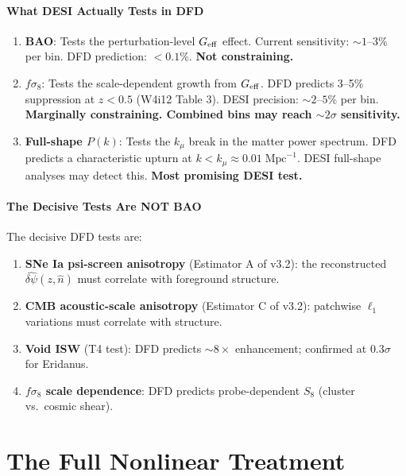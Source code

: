 \documentclass[11pt,a4paper]{article}
\newcounter{findingctr}
\newenvironment{finding}[1][]{%
  \refstepcounter{findingctr}%
  \begin{tcolorbox}[colback=blue!3!white, colframe=blue!50!black,
    title=\textbf{Finding \thefindingctr: #1}]
}{%
  \end{tcolorbox}%
}
\newcommand{\Geff}{G_{\rm eff}}
\begin{document}
\begin{finding}[\textbf{DFD Survives DESI}---But the Test Was Always
  the Wrong One]
\subsection*{What DESI Actually Tests in DFD}

\begin{enumerate}
\item \textbf{BAO}: Tests the perturbation-level $\Geff$ effect.
  Current sensitivity: $\sim 1$--$3\%$ per bin.  DFD prediction:
  $< 0.1\%$.  \textbf{Not constraining.}

\item \textbf{$f\sigma_8$}: Tests the scale-dependent growth from
  $\Geff$.  DFD predicts 3--5\% suppression at $z < 0.5$
  (W4i12 Table 3).  DESI precision: $\sim 2$--$5\%$ per bin.
  \textbf{Marginally constraining.  Combined bins may reach
  $\sim 2\sigma$ sensitivity.}

\item \textbf{Full-shape $P(k)$}: Tests the $k_\mu$ break in the
  matter power spectrum.  DFD predicts a characteristic upturn at
  $k < k_\mu \approx 0.01\;\text{Mpc}^{-1}$.  DESI full-shape
  analyses may detect this.  \textbf{Most promising DESI test.}
\end{enumerate}

\subsection*{The Decisive Tests Are NOT BAO}

The decisive DFD tests are:
\begin{enumerate}
\item \textbf{SNe Ia psi-screen anisotropy} (Estimator A of v3.2):
  the reconstructed $\widehat{\delta\psi}(z,\hat n)$ must correlate
  with foreground structure.
\item \textbf{CMB acoustic-scale anisotropy} (Estimator C of v3.2):
  patchwise $\ell_1$ variations must correlate with structure.
\item \textbf{Void ISW} (T4 test): DFD predicts $\sim 8\times$
  enhancement; confirmed at $0.3\sigma$ for Eridanus.
\item \textbf{$f\sigma_8$ scale dependence}: DFD predicts
  probe-dependent $S_8$ (cluster vs.\ cosmic shear).
\end{enumerate}

\end{finding}


\part{The Full Nonlinear Treatment}
\label{part:nonlinear}
\end{document}
